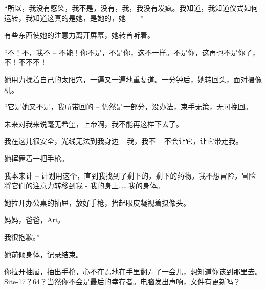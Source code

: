\begin{scpdialog}
“所以，我没有感染，我不是，没有，我，我没有发疯。我知道，我知道仪式如何运转，我知道这真的是她，是她的，她——”
\end{scpdialog}

\begin{scpbox}
有些东西使她的注意力离开屏幕，她转首听着。
\end{scpbox}

\begin{scpdialog}
“不！不，我不 – 不能！你不是，不是你，这不一样。不是你，这再也不是你了，不！不不不！
\end{scpdialog}

\begin{scpbox}
她用力揉着自己的太阳穴，一遍又一遍地重复道。一分钟后，她转回头，面对摄像机。
\end{scpbox}

\begin{scpdialog}
“它是她又不是，我所带回的 – 仍然是一部分，没办法，束手无策，无可挽回。

未来对我来说毫无希望，上帝啊，我不能再这样下去了。

我在这儿很安全，光线无法到我身边 – 我，我不 – 不会让它，让它带走我。
\end{scpdialog}

\begin{scpbox}
她挥舞着一把手枪。
\end{scpbox}

\begin{scpdialog}
我本来计 – 计划用这个，直到我找到了剩下的，剩下的药物。我不想冒险，冒险将它们的注意力转移到我 - 我的身上……我的身体。
\end{scpdialog}

\begin{scpbox}
她拉开办公桌的抽屉，放好手枪，抬起眼皮凝视着摄像头。
\end{scpbox}

\begin{scpdialog}
妈妈，爸爸，Ari。

我很抱歉。”
\end{scpdialog}

\begin{scpbox}
她前倾身体，记录结束。
\end{scpbox}

\hr



\begin{scpbox}
你拉开抽屉，抽出手枪，心不在焉地在手里翻弄了一会儿，想知道你该到那里去。Site-17？64？当然你不会是最后的幸存者。电脑发出声响，文件有更新吗？
\end{scpbox}

